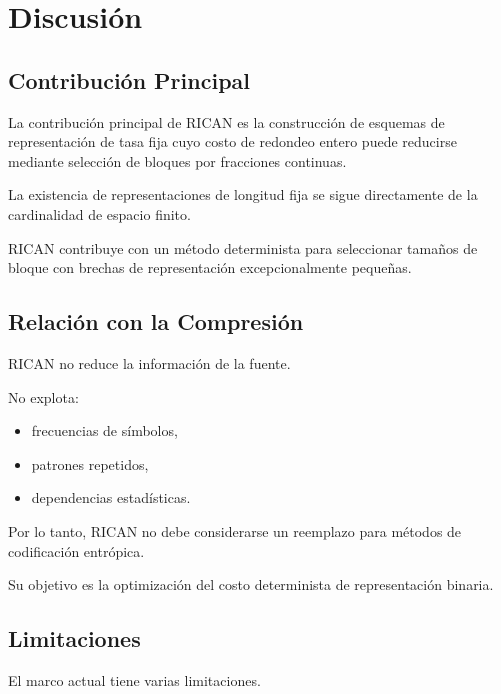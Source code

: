 \documentclass[onecolumn]{IEEEtran}
\begin{document}

\section{Discusión}

\subsection{Contribución Principal}

La contribución principal de RICAN es la construcción de esquemas de
representación de tasa fija cuyo costo de redondeo entero puede
reducirse mediante selección de bloques por fracciones continuas.

La existencia de representaciones de longitud fija se sigue
directamente de la cardinalidad de espacio finito.

RICAN contribuye con un método determinista para seleccionar tamaños
de bloque con brechas de representación excepcionalmente pequeñas.

\subsection{Relación con la Compresión}

RICAN no reduce la información de la fuente.

No explota:

\begin{itemize}

\item frecuencias de símbolos,

\item patrones repetidos,

\item dependencias estadísticas.

\end{itemize}

Por lo tanto, RICAN no debe considerarse un reemplazo para métodos de
codificación entrópica.

Su objetivo es la optimización del costo determinista de
representación binaria.

\subsection{Limitaciones}

El marco actual tiene varias limitaciones.
\end{document}
